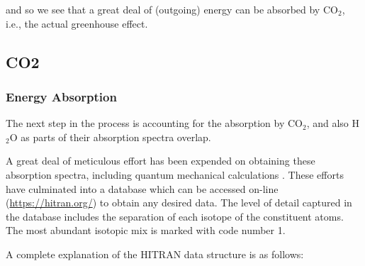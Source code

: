 \documentclass[10pt,a4paper,titlepage]{article}
\begin{document}
and so we see that a great deal of (outgoing) energy can be absorbed
by CO$_{\text{2}}$, i.e., the actual greenhouse effect.

\subsection{CO2}
\label{sec-3-3}
\subsubsection{Energy Absorption}
\label{sec-3-3-1}

The next step in the process is accounting for the absorption by
CO$_{\text{2}}$, and also H$_{\text{2}}$O as parts of their absorption spectra overlap.

A great deal of meticulous effort has been expended on obtaining these
absorption spectra, including quantum mechanical calculations
\citep{rothman-al2009:hitran,lamouroux-al12:database,etminan-al16:forcing,mlynczak-al16:spectroscopic}.
These efforts have culminated into a database which can be accessed
on-line (\url{https://hitran.org/}) to obtain any desired data.  The level
of detail captured in the database includes the separation of each
isotope of the constituent atoms. The most abundant isotopic mix is
marked with code number 1.

A complete explanation of the  HITRAN data structure is as follows:
\end{document}
